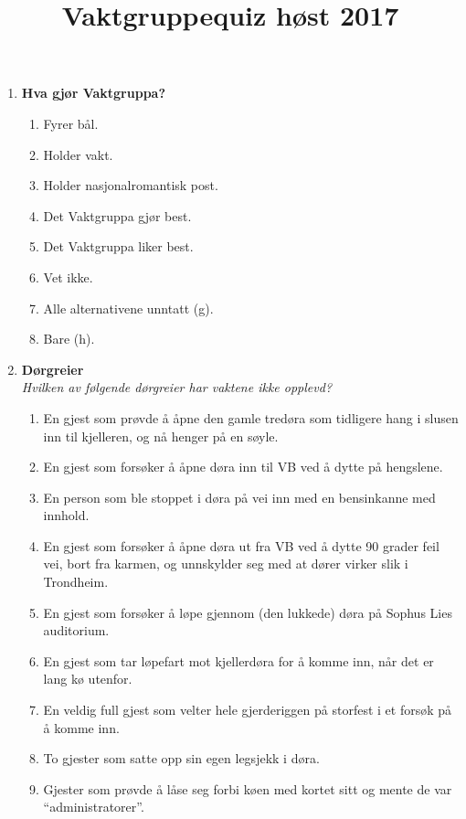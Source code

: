\documentclass[11pt]{article}
\begin{document}
\title{Vaktgruppequiz høst 2017}
\date{}
\maketitle
\vspace{-1cm}
\begin{enumerate}
\item \textbf{Hva gjør Vaktgruppa?}
    \begin{enumerate}
        \item Fyrer bål.
        \item Holder vakt.
        \item Holder nasjonalromantisk post.
        \item Det Vaktgruppa gjør best.
        \item Det Vaktgruppa liker best.
        \item Vet ikke. 
        \item Alle alternativene unntatt (g).
        \item Bare (h).
    \end{enumerate}
\item \textbf{Dørgreier} \vspace{1mm}\\
\textit{Hvilken av følgende dørgreier har vaktene ikke opplevd?}
    \begin{enumerate}
        \item En gjest som prøvde å åpne den gamle tredøra som tidligere hang i slusen inn til kjelleren, og nå henger på en søyle.
        \item En gjest som forsøker å åpne døra inn til VB ved å dytte på hengslene.
        \item En person som ble stoppet i døra på vei inn med en bensinkanne med innhold.
        \item En gjest som forsøker å åpne døra ut fra VB ved å dytte 90 grader feil vei, bort fra karmen, og unnskylder seg med at dører virker slik i Trondheim.
        \item En gjest som forsøker å løpe gjennom (den lukkede) døra på Sophus Lies auditorium.
        \item En gjest som tar løpefart mot kjellerdøra for å komme inn, når det er lang kø utenfor.
        \item En veldig full gjest som velter hele gjerderiggen på storfest i et forsøk på å komme inn.
        \item To gjester som satte opp sin egen legsjekk i døra.
	\item Gjester som prøvde å låse seg forbi køen med kortet sitt og mente de var ``administratorer''.

\end{enumerate}
\end{enumerate}
\end{document}
